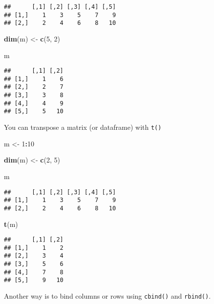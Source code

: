 \documentclass[
]{book}
\newenvironment{Shaded}{\begin{snugshade}}{\end{snugshade}}
\newcommand{\DecValTok}[1]{\textcolor[rgb]{0.00,0.00,0.81}{#1}}
\newcommand{\KeywordTok}[1]{\textcolor[rgb]{0.13,0.29,0.53}{\textbf{#1}}}
\newcommand{\NormalTok}[1]{#1}
\newcommand{\OperatorTok}[1]{\textcolor[rgb]{0.81,0.36,0.00}{\textbf{#1}}}
\newcommand{\StringTok}[1]{\textcolor[rgb]{0.31,0.60,0.02}{#1}}
\begin{document}
\begin{verbatim}
##      [,1] [,2] [,3] [,4] [,5]
## [1,]    1    3    5    7    9
## [2,]    2    4    6    8   10
\end{verbatim}

\begin{Shaded}
\begin{Highlighting}[]
\KeywordTok{dim}\NormalTok{(m) \textless{}{-}}\StringTok{ }\KeywordTok{c}\NormalTok{(}\DecValTok{5}\NormalTok{, }\DecValTok{2}\NormalTok{)}

\NormalTok{m}
\end{Highlighting}
\end{Shaded}

\begin{verbatim}
##      [,1] [,2]
## [1,]    1    6
## [2,]    2    7
## [3,]    3    8
## [4,]    4    9
## [5,]    5   10
\end{verbatim}

You can transpose a matrix (or dataframe) with \texttt{t()}

\begin{Shaded}
\begin{Highlighting}[]
\NormalTok{m \textless{}{-}}\StringTok{ }\DecValTok{1}\OperatorTok{:}\DecValTok{10}

\KeywordTok{dim}\NormalTok{(m) \textless{}{-}}\StringTok{ }\KeywordTok{c}\NormalTok{(}\DecValTok{2}\NormalTok{, }\DecValTok{5}\NormalTok{)}

\NormalTok{m}
\end{Highlighting}
\end{Shaded}

\begin{verbatim}
##      [,1] [,2] [,3] [,4] [,5]
## [1,]    1    3    5    7    9
## [2,]    2    4    6    8   10
\end{verbatim}

\begin{Shaded}
\begin{Highlighting}[]
\KeywordTok{t}\NormalTok{(m)}
\end{Highlighting}
\end{Shaded}

\begin{verbatim}
##      [,1] [,2]
## [1,]    1    2
## [2,]    3    4
## [3,]    5    6
## [4,]    7    8
## [5,]    9   10
\end{verbatim}

Another way is to bind columns or rows using \texttt{cbind()} and \texttt{rbind()}.
\end{document}
